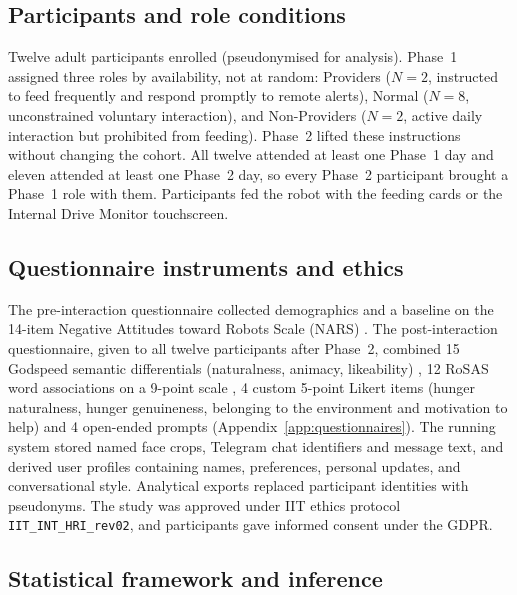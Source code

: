 \subsection{Participants and role conditions}
\label{subsec:participants-role-conditions}

Twelve adult participants enrolled (pseudonymised for analysis). Phase~1 assigned three roles by availability, not at random: Providers ($N=2$, instructed to feed frequently and respond promptly to remote alerts), Normal ($N=8$, unconstrained voluntary interaction), and Non-Providers ($N=2$, active daily interaction but prohibited from feeding). Phase~2 lifted these instructions without changing the cohort. All twelve attended at least one Phase~1 day and eleven attended at least one Phase~2 day, so every Phase~2 participant brought a Phase~1 role with them. Participants fed the robot with the feeding cards or the Internal Drive Monitor touchscreen.

\subsection{Questionnaire instruments and ethics}
\label{subsec:questionnaire-instruments}

The pre-interaction questionnaire collected demographics and a baseline on the 14-item Negative Attitudes toward Robots Scale (NARS) \citep{Nomura2006NARS}. The post-interaction questionnaire, given to all twelve participants after Phase~2, combined 15 Godspeed semantic differentials (naturalness, animacy, likeability) \citep{Bartneck2009Godspeed}, 12 RoSAS word associations on a 9-point scale \citep{Carpinella2017RoSAS}, 4 custom 5-point Likert items (hunger naturalness, hunger genuineness, belonging to the environment and motivation to help) and 4 open-ended prompts (Appendix~\ref{app:questionnaires}). The running system stored named face crops, Telegram chat identifiers and message text, and derived user profiles containing names, preferences, personal updates, and conversational style. Analytical exports replaced participant identities with pseudonyms. The study was approved under IIT ethics protocol \texttt{IIT\_INT\_HRI\_rev02}, and participants gave informed consent under the GDPR.

\subsection{Statistical framework and inference}
\label{subsec:statistical-framework}

